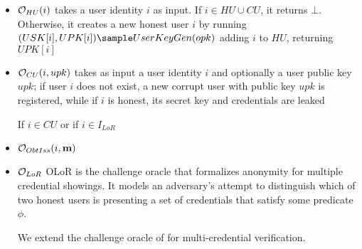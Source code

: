 \begin{itemize}
    \item $\mathcal{O}_{HU}(i)$ takes a user identity $i$ as input. If $i \in HU \cup CU$, it returns $\bot$. Otherwise, it creates a new honest user $i$ by running $(USK[i], UPK[i]) \sample UserKeyGen(opk)$ adding $i$ to $HU$, returning $UPK[i]$
    
    \item $\mathcal{O}_{CU}(i, upk)$ takes as input a user identity $i$ and optionally a user public key $upk$; if user $i$ does not exist, a new corrupt user with public key $upk$ is registered, while if $i$ is honest, its secret key and credentials are leaked

    If $i \in CU$ or if $i \in I_{LoR}$

    \item $\mathcal{O}_{ObtIss}(i, \textbf{m})$ 


    \item $\mathcal{O}_{LoR}$
    OLoR is the challenge oracle that formalizes anonymity for multiple credential showings. It models an adversary's attempt to distinguish which of two honest users is presenting a set of credentials that satisfy some predicate $\phi$.

    

    
    
    We extend the challenge oracle of \cite{fuchsbauer_structure-preserving_2019} for multi-credential verification. 
    
    

    

\end{itemize}





